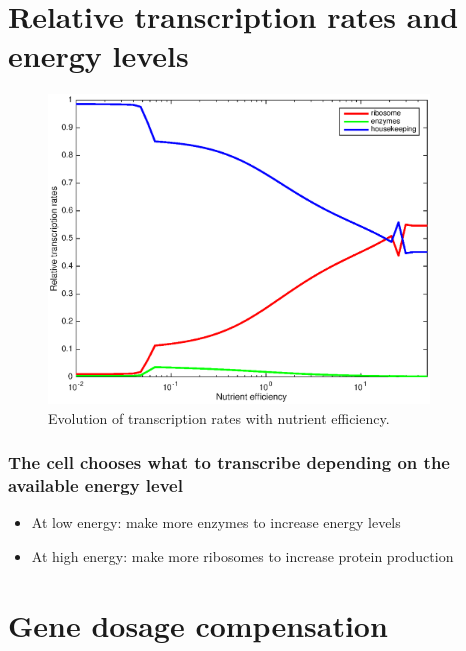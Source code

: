 \documentclass{beamer}
\begin{document}
\section{Relative transcription rates and energy levels}

\begin{frame}
\tableofcontents[currentsection]
\end{frame}

\begin{frame}
\begin{figure}
\includegraphics[width=0.9\textwidth]{transcription.eps}
\caption{Evolution of transcription rates with nutrient efficiency.}
\end{figure}
\end{frame}

\begin{frame}
\frametitle{The cell chooses what to transcribe depending on the available energy level}
\begin{itemize}
\item At low energy: make more enzymes to increase energy levels
\item At high energy: make more ribosomes to increase protein production
\end{itemize}
\end{frame}

\section{Gene dosage compensation}

\begin{frame}
\tableofcontents[currentsection]
\end{frame}
\end{document}
